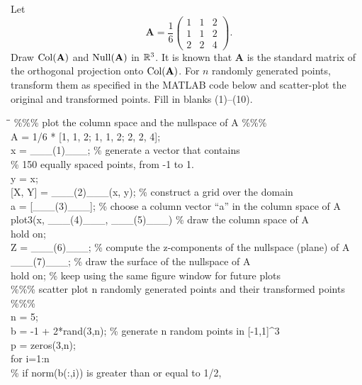 \documentclass[11pt,oneside]{article}
\begin{document}
\begin{problem}
Let
\[
\mathbf A=\frac16
\begin{pmatrix}
1&1&2\\
1&1&2\\
2&2&4
\end{pmatrix}.
\]
Draw $\operatorname{Col}(\mathbf A)$ and $\operatorname{Null}(\mathbf A)$ in $\mathbb{R}^3$. It is known that $\mathbf A$ is the standard matrix of the orthogonal projection onto $\operatorname{Col}(\mathbf A)$. For $n$ randomly generated points, transform them as specified in the MATLAB code below and scatter-plot the original and transformed points. Fill in blanks \textup{(1)}--\textup{(10)}.

{\small\ttfamily
\begin{tabbing}
\hspace{2em}\=\hspace{2em}\=\kill
\%\%\% plot the column space and the nullspace of A \%\%\%\\
A = 1/6 * [1, 1, 2; 1, 1, 2; 2, 2, 4];\\
x = \_\_\_(1)\_\_\_; \% generate a vector that contains\\
\>\% 150 equally spaced points, from -1 to 1.\\
y = x;\\
{}[X, Y] = \_\_\_(2)\_\_\_(x, y); \% construct a grid over the domain\\[0.15em]
a = [\_\_\_(3)\_\_\_]; \% choose a column vector ``a'' in the column space of A\\
plot3(x, \_\_\_(4)\_\_\_, \_\_\_(5)\_\_\_) \% draw the column space of A\\
hold on;\\[0.15em]
Z = \_\_\_(6)\_\_\_; \% compute the z-components of the nullspace (plane) of A\\
\_\_\_(7)\_\_\_; \% draw the surface of the nullspace of A\\
hold on; \% keep using the same figure window for future plots\\[0.15em]
\%\%\% scatter plot n randomly generated points and their transformed points \%\%\%\\
n = 5;\\
b = -1 + 2*rand(3,n); \% generate n random points in [-1,1]\textasciicircum 3\\
p = zeros(3,n);\\
for i=1:n\\
\>\% if norm(b(:,i)) is greater than or equal to 1/2,\\

\end{tabbing}}
\end{problem}
\end{document}
